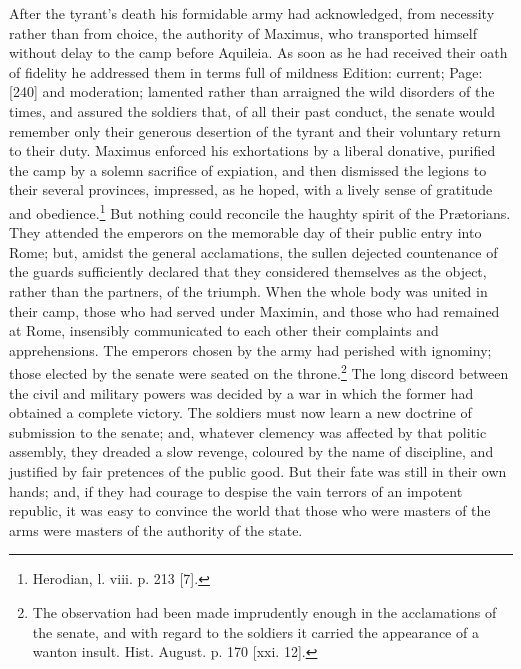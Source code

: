 After the tyrant\texthebrew{}’s death his formidable army had acknowledged, from necessity rather than from choice, the authority of Maximus, who transported himself without delay to the camp before Aquileia. As soon as he had received their oath of fidelity he addressed them in terms full of mildness Edition: current; Page: [240] and moderation; lamented rather than arraigned the wild disorders of the times, and assured the soldiers that, of all their past conduct, the senate would remember only their generous desertion of the tyrant and their voluntary return to their duty. Maximus enforced his exhortations by a liberal donative, purified the camp by a solemn sacrifice of expiation, and then dismissed the legions to their several provinces, impressed, as he hoped, with a lively sense of gratitude and obedience.\footnote{Herodian, l. viii. p. 213 [7].} But nothing could reconcile the haughty spirit of the Prætorians. They attended the emperors on the memorable day of their public entry into Rome; but, amidst the general acclamations, the sullen dejected countenance of the guards sufficiently declared that they considered themselves as the object, rather than the partners, of the triumph. When the whole body was united in their camp, those who had served under Maximin, and those who had remained at Rome, insensibly communicated to each other their complaints and apprehensions. The emperors chosen by the army had perished with ignominy; those elected by the senate were seated on the throne.\footnote{The observation had been made imprudently enough in the acclamations of the senate, and with regard to the soldiers it carried the appearance of a wanton insult. Hist. August. p. 170 [xxi. 12].} The long discord between the civil and military powers was decided by a war in which the former had obtained a complete victory. The soldiers must now learn a new doctrine of submission to the senate; and, whatever clemency was affected by that politic assembly, they dreaded a slow revenge, coloured by the name of discipline, and justified by fair pretences of the public good. But their fate was still in their own hands; and, if they had courage to despise the vain terrors of an impotent republic, it was easy to convince the world that those who were masters of the arms were masters of the authority of the state.

